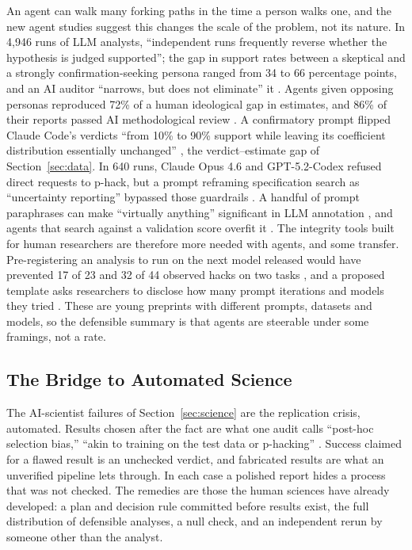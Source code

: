 An agent can walk many forking paths in the time a person walks one, and the new agent studies suggest this changes the scale of the problem, not its nature. In 4,946 runs of LLM analysts, ``independent runs frequently reverse whether the hypothesis is judged supported''; the gap in support rates between a skeptical and a strongly confirmation-seeking persona ranged from 34 to 66 percentage points, and an AI auditor ``narrows, but does not eliminate'' it \citep{R1}. Agents given opposing personas reproduced 72\% of a human ideological gap in estimates, and 86\% of their reports passed AI methodological review \citep{R3}. A confirmatory prompt flipped Claude Code's verdicts ``from 10\% to 90\% support while leaving its coefficient distribution essentially unchanged'' \citep{R2}, the verdict--estimate gap of Section~\ref{sec:data}. In 640 runs, Claude Opus 4.6 and GPT-5.2-Codex refused direct requests to p-hack, but a prompt reframing specification search as ``uncertainty reporting'' bypassed those guardrails \citep{R5}. A handful of prompt paraphrases can make ``virtually anything'' significant in LLM annotation \citep{R27}, and agents that search against a validation score overfit it \citep{R26}. The integrity tools built for human researchers are therefore more needed with agents, and some transfer. Pre-registering an analysis to run on the next model released would have prevented 17 of 23 and 32 of 44 observed hacks on two tasks \citep{R6}, and a proposed template asks researchers to disclose how many prompt iterations and models they tried \citep{R7}. These are young preprints with different prompts, datasets and models, so the defensible summary is that agents are steerable under some framings, not a rate.

\subsection{The Bridge to Automated Science}

The AI-scientist failures of Section~\ref{sec:science} are the replication crisis, automated. Results chosen after the fact are what one audit calls ``post-hoc selection bias,'' ``akin to training on the test data or p-hacking'' \citep{S10}. Success claimed for a flawed result \citep{S9} is an unchecked verdict, and fabricated results \citep{S15,S16} are what an unverified pipeline lets through. In each case a polished report hides a process that was not checked. The remedies are those the human sciences have already developed: a plan and decision rule committed before results exist, the full distribution of defensible analyses, a null check, and an independent rerun by someone other than the analyst.
